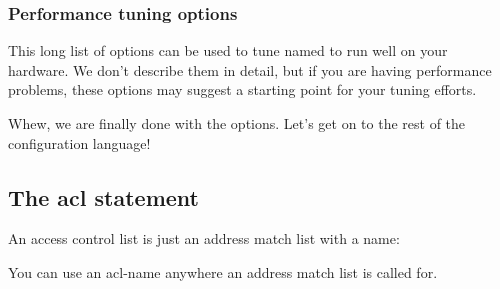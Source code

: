 \subsubsection[Performance tuning options]{\texorpdfstring{Performance
tuning
options\protect\hypertarget{part0024_split_037.htmlux5cux23_idIndexMarker2166}{}{}\protect\hypertarget{part0024_split_037.htmlux5cux23_idIndexMarker2167}{}{}\protect\hypertarget{part0024_split_037.htmlux5cux23_idIndexMarker2168}{}{}\protect\hypertarget{part0024_split_037.htmlux5cux23_idIndexMarker2169}{}{}\protect\hypertarget{part0024_split_037.htmlux5cux23_idIndexMarker2170}{}{}\protect\hypertarget{part0024_split_037.htmlux5cux23_idIndexMarker2171}{}{}\protect\hypertarget{part0024_split_037.htmlux5cux23_idIndexMarker2172}{}{}\protect\hypertarget{part0024_split_037.htmlux5cux23_idIndexMarker2173}{}{}\protect\hypertarget{part0024_split_037.htmlux5cux23_idIndexMarker2174}{}{}\protect\hypertarget{part0024_split_037.htmlux5cux23_idIndexMarker2175}{}{}\protect\hypertarget{part0024_split_037.htmlux5cux23_idIndexMarker2176}{}{}}{Performance tuning options}}


This long list of options can be used to tune {named} to run well on
your hardware. We don't describe them in detail, but if you are having
performance problems, these options may suggest a starting point for
your tuning efforts.

Whew, we are finally done with the options. Let's get on to the rest of
the configuration language!

\protect\hypertarget{part0024_split_038.html}{}{}

\hypertarget{part0024_split_038.htmlux5cux23_idContainer1069}{}
\hypertarget{part0024_split_038.htmlux5cux23calibre_pb_37}{%
\subsection[The {acl}
statement]{\texorpdfstring{\protect\hypertarget{part0024_split_038.htmlux5cux23_idTextAnchor904}{}{}The
{acl}
statement}{The acl statement}}\label{part0024_split_038.htmlux5cux23calibre_pb_37}}

\protect\hypertarget{part0024_split_038.htmlux5cux23_idIndexMarker2177}{}{}\protect\hypertarget{part0024_split_038.htmlux5cux23_idIndexMarker2178}{}{}An
access control list is just an address match list with a name:


You can use an {acl-name} anywhere an address match list is called for.

